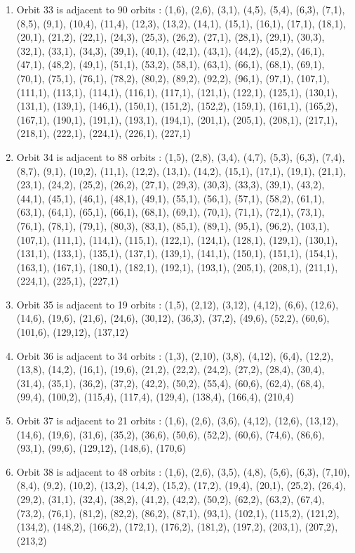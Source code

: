\documentclass[12pt]{article}
\begin{document}
\begin{enumerate}
\item Orbit 33 is adjacent to 90 orbits : (1,6), (2,6), (3,1), (4,5), (5,4), (6,3), (7,1), (8,5), (9,1), (10,4), (11,4), (12,3), (13,2), (14,1), (15,1), (16,1), (17,1), (18,1), (20,1), (21,2), (22,1), (24,3), (25,3), (26,2), (27,1), (28,1), (29,1), (30,3), (32,1), (33,1), (34,3), (39,1), (40,1), (42,1), (43,1), (44,2), (45,2), (46,1), (47,1), (48,2), (49,1), (51,1), (53,2), (58,1), (63,1), (66,1), (68,1), (69,1), (70,1), (75,1), (76,1), (78,2), (80,2), (89,2), (92,2), (96,1), (97,1), (107,1), (111,1), (113,1), (114,1), (116,1), (117,1), (121,1), (122,1), (125,1), (130,1), (131,1), (139,1), (146,1), (150,1), (151,2), (152,2), (159,1), (161,1), (165,2), (167,1), (190,1), (191,1), (193,1), (194,1), (201,1), (205,1), (208,1), (217,1), (218,1), (222,1), (224,1), (226,1), (227,1)
\item Orbit 34 is adjacent to 88 orbits : (1,5), (2,8), (3,4), (4,7), (5,3), (6,3), (7,4), (8,7), (9,1), (10,2), (11,1), (12,2), (13,1), (14,2), (15,1), (17,1), (19,1), (21,1), (23,1), (24,2), (25,2), (26,2), (27,1), (29,3), (30,3), (33,3), (39,1), (43,2), (44,1), (45,1), (46,1), (48,1), (49,1), (55,1), (56,1), (57,1), (58,2), (61,1), (63,1), (64,1), (65,1), (66,1), (68,1), (69,1), (70,1), (71,1), (72,1), (73,1), (76,1), (78,1), (79,1), (80,3), (83,1), (85,1), (89,1), (95,1), (96,2), (103,1), (107,1), (111,1), (114,1), (115,1), (122,1), (124,1), (128,1), (129,1), (130,1), (131,1), (133,1), (135,1), (137,1), (139,1), (141,1), (150,1), (151,1), (154,1), (163,1), (167,1), (180,1), (182,1), (192,1), (193,1), (205,1), (208,1), (211,1), (224,1), (225,1), (227,1)
\item Orbit 35 is adjacent to 19 orbits : (1,5), (2,12), (3,12), (4,12), (6,6), (12,6), (14,6), (19,6), (21,6), (24,6), (30,12), (36,3), (37,2), (49,6), (52,2), (60,6), (101,6), (129,12), (137,12)
\item Orbit 36 is adjacent to 34 orbits : (1,3), (2,10), (3,8), (4,12), (6,4), (12,2), (13,8), (14,2), (16,1), (19,6), (21,2), (22,2), (24,2), (27,2), (28,4), (30,4), (31,4), (35,1), (36,2), (37,2), (42,2), (50,2), (55,4), (60,6), (62,4), (68,4), (99,4), (100,2), (115,4), (117,4), (129,4), (138,4), (166,4), (210,4)
\item Orbit 37 is adjacent to 21 orbits : (1,6), (2,6), (3,6), (4,12), (12,6), (13,12), (14,6), (19,6), (31,6), (35,2), (36,6), (50,6), (52,2), (60,6), (74,6), (86,6), (93,1), (99,6), (129,12), (148,6), (170,6)
\item Orbit 38 is adjacent to 48 orbits : (1,6), (2,6), (3,5), (4,8), (5,6), (6,3), (7,10), (8,4), (9,2), (10,2), (13,2), (14,2), (15,2), (17,2), (19,4), (20,1), (25,2), (26,4), (29,2), (31,1), (32,4), (38,2), (41,2), (42,2), (50,2), (62,2), (63,2), (67,4), (73,2), (76,1), (81,2), (82,2), (86,2), (87,1), (93,1), (102,1), (115,2), (121,2), (134,2), (148,2), (166,2), (172,1), (176,2), (181,2), (197,2), (203,1), (207,2), (213,2)

\end{enumerate}
\end{document}
